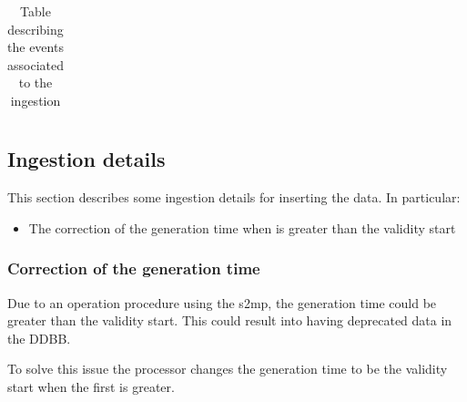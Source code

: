 \begin{landscape}
\begin{longtable}{|M{0.15\linewidth}|M{0.05\linewidth}|M{0.10\linewidth}|M{0.10\linewidth}|M{0.15\linewidth}|M{0.15\linewidth}|M{0.15\linewidth}|}
\caption{Table describing the events associated to the ingestion}
\label{tb:description_events_ingestion_nppf}
\end{longtable}
\end{landscape}

\subsection{Ingestion details}

This section describes some ingestion details for inserting the data. In particular:

\begin{itemize} 

\item The correction of the generation time when is greater than the validity start
  
\end{itemize}

\subsubsection{Correction of the generation time}

Due to an operation procedure using the \acrshort{s2mp}, the generation time could be greater than the validity start. This could result into having deprecated data in the DDBB.

To solve this issue the processor changes the generation time to be the validity start when the first is greater.
